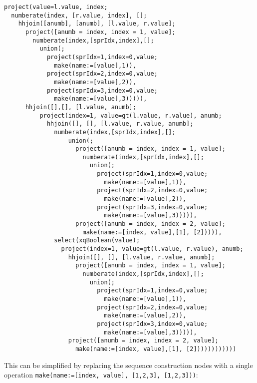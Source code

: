 \begin{Verbatim}
project(value=l.value, index;
  numberate(index, [r.value, index], [];
    hhjoin([anumb], [anumb], [l.value, r.value];
      project([anumb = index, index = 1, value];
        numberate(index,[sprIdx,index],[];
          union(;
            project(sprIdx=1,index=0,value;
              make(name:=[value],1)),
            project(sprIdx=2,index=0,value;
              make(name:=[value],2)),
            project(sprIdx=3,index=0,value;
              make(name:=[value],3))))),
      hhjoin([],[], [l.value, anumb];
          project(index=1, value=gt(l.value, r.value), anumb;
            hhjoin([], [], [l.value, r.value, anumb];
              numberate(index,[sprIdx,index],[];
                  union(;
                    project([anumb = index, index = 1, value];
                      numberate(index,[sprIdx,index],[];
                        union(;
                          project(sprIdx=1,index=0,value;
                            make(name:=[value],1)),
                          project(sprIdx=2,index=0,value;
                            make(name:=[value],2)),
                          project(sprIdx=3,index=0,value;
                            make(name:=[value],3))))),
                    project([anumb = index, index = 2, value];
                      make(name:=[index, value],[1], [2])))),
              select(xqBoolean(value);
                project(index=1, value=gt(l.value, r.value), anumb;
                  hhjoin([], [], [l.value, r.value, anumb];
                    project([anumb = index, index = 1, value];
                      numberate(index,[sprIdx,index],[];
                        union(;
                          project(sprIdx=1,index=0,value;
                            make(name:=[value],1)),
                          project(sprIdx=2,index=0,value;
                            make(name:=[value],2)),
                          project(sprIdx=3,index=0,value;
                            make(name:=[value],3))))),
                  project([anumb = index, index = 2, value];
                    make(name:=[index, value],[1], [2])))))))))))
\end{Verbatim}
 
This can be simplified by replacing the sequence construction nodes with a
single operation \texttt{make(name:=[index, value], [1,2,3], [1,2,3]))}:

